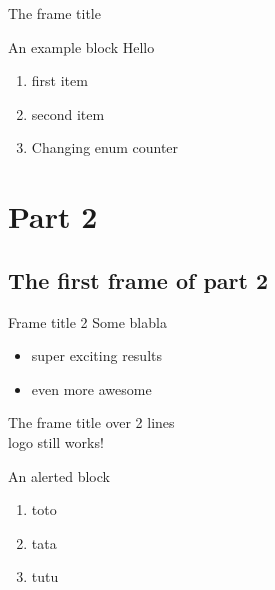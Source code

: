 \documentclass[presentation, aspectratio=169]{beamer}
\begin{document}
\begin{frame}{The frame title}
\begin{overprint}

    \begin{exampleblock}{An example block}
      Hello
    \end{exampleblock}
  \end{overprint}

  \begin{enumerate}
  \item first item
  \item second item
    \setcounter{enumi}{5}
  \item Changing enum counter
  \end{enumerate}
\end{frame}

\section{Part 2}
\label{sec:part2}
\subsection{The first frame of part 2}
\label{sec:first_frame2}
\begin{frame}{Frame title 2}
  Some blabla
  \begin{itemize}
  \item super exciting results
  \item even more awesome
  \end{itemize}
\end{frame}

\begin{frame}{The frame title over 2 lines \\  logo still works!}
  \begin{alertblock}{An alerted block}
    \begin{enumerate}
    \item toto
    \item tata
    \item tutu
    \end{enumerate}
  \end{alertblock}
\end{frame}
\end{document}
